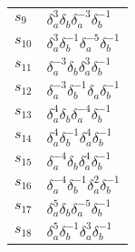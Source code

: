 \documentclass{article}
\begin{document}
\begin{center}
\begin{tabular}{ll}
$s_{9}$ & $\delta_a^{3}\delta_b^{}\delta_a^{-3}\delta_b^{-1}$ \\
$s_{10}$ & $\delta_a^{3}\delta_b^{-1}\delta_a^{-5}\delta_b^{-1}$ \\
$s_{11}$ & $\delta_a^{-3}\delta_b^{}\delta_a^{3}\delta_b^{-1}$ \\
$s_{12}$ & $\delta_a^{-3}\delta_b^{-1}\delta_a^{}\delta_b^{-1}$ \\
$s_{13}$ & $\delta_a^{4}\delta_b^{}\delta_a^{-4}\delta_b^{-1}$ \\
$s_{14}$ & $\delta_a^{4}\delta_b^{-1}\delta_a^{4}\delta_b^{-1}$ \\
$s_{15}$ & $\delta_a^{-4}\delta_b^{}\delta_a^{4}\delta_b^{-1}$ \\
$s_{16}$ & $\delta_a^{-4}\delta_b^{-1}\delta_a^{2}\delta_b^{-1}$ \\
$s_{17}$ & $\delta_a^{5}\delta_b^{}\delta_a^{-5}\delta_b^{-1}$ \\
$s_{18}$ & $\delta_a^{5}\delta_b^{-1}\delta_a^{3}\delta_b^{-1}$ \\
\bottomrule
\end{tabular}
\end{center}

\thispagestyle{empty}
\end{document}
